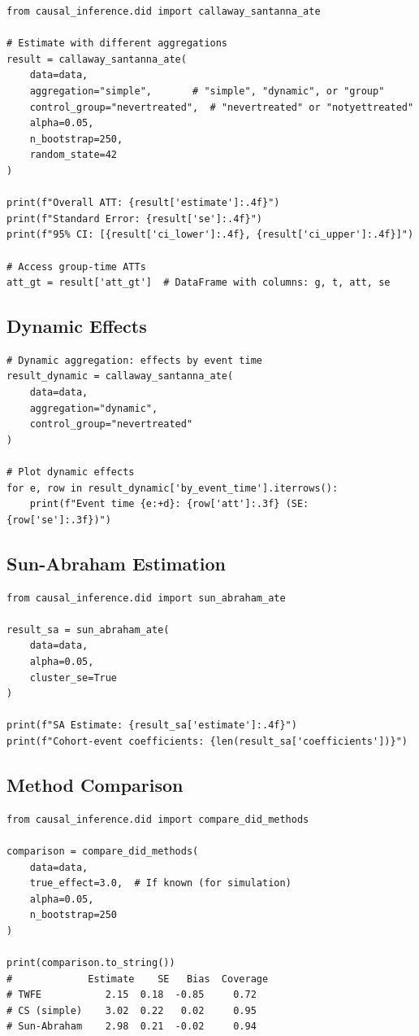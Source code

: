 \begin{verbatim}
from causal_inference.did import callaway_santanna_ate

# Estimate with different aggregations
result = callaway_santanna_ate(
    data=data,
    aggregation="simple",       # "simple", "dynamic", or "group"
    control_group="nevertreated",  # "nevertreated" or "notyettreated"
    alpha=0.05,
    n_bootstrap=250,
    random_state=42
)

print(f"Overall ATT: {result['estimate']:.4f}")
print(f"Standard Error: {result['se']:.4f}")
print(f"95% CI: [{result['ci_lower']:.4f}, {result['ci_upper']:.4f}]")

# Access group-time ATTs
att_gt = result['att_gt']  # DataFrame with columns: g, t, att, se
\end{verbatim}

\subsection{Dynamic Effects}

\begin{verbatim}
# Dynamic aggregation: effects by event time
result_dynamic = callaway_santanna_ate(
    data=data,
    aggregation="dynamic",
    control_group="nevertreated"
)

# Plot dynamic effects
for e, row in result_dynamic['by_event_time'].iterrows():
    print(f"Event time {e:+d}: {row['att']:.3f} (SE: {row['se']:.3f})")
\end{verbatim}

\subsection{Sun-Abraham Estimation}

\begin{verbatim}
from causal_inference.did import sun_abraham_ate

result_sa = sun_abraham_ate(
    data=data,
    alpha=0.05,
    cluster_se=True
)

print(f"SA Estimate: {result_sa['estimate']:.4f}")
print(f"Cohort-event coefficients: {len(result_sa['coefficients'])}")
\end{verbatim}

\subsection{Method Comparison}

\begin{verbatim}
from causal_inference.did import compare_did_methods

comparison = compare_did_methods(
    data=data,
    true_effect=3.0,  # If known (for simulation)
    alpha=0.05,
    n_bootstrap=250
)

print(comparison.to_string())
#             Estimate    SE   Bias  Coverage
# TWFE           2.15  0.18  -0.85     0.72
# CS (simple)    3.02  0.22   0.02     0.95
# Sun-Abraham    2.98  0.21  -0.02     0.94
\end{verbatim}

